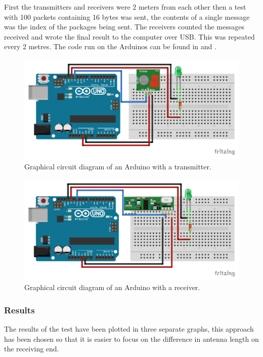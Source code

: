 First the transmitters and receivers were 2 meters from each other then a test with 100 packets containing 16 bytes was sent, the contents of a single message was the index of the packages being sent. 
The receivers counted the messages received and wrote the final result to the computer over USB. 
This was repeated every 2 metres. 
The code run on the Arduinos can be found in  and .  

\begin{figure}[p]
\centering
\includegraphics[width=\linewidth]{Figures/Fritzing/Transmitter.pdf} 
\caption{Graphical circuit diagram of an Arduino with a transmitter.}
\label{fig:Transmitter}   
\end{figure}

\begin{figure}[p]
\centering
\includegraphics[width=\linewidth]{Figures/Fritzing/Receiver.pdf} 
\caption{Graphical circuit diagram of an Arduino with a receiver.}
\label{fig:Receiver}   
\end{figure}

\subsubsection*{Results}
The results of the test have been plotted in three separate graphs, this approach has been chosen so that it is easier to focus on the difference in antenna length on the receiving end.


